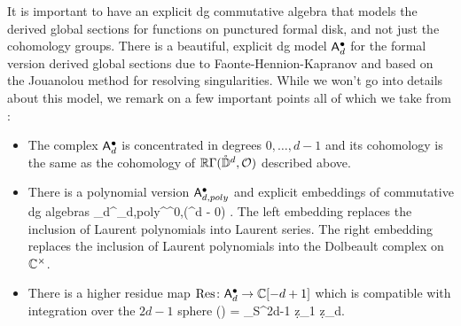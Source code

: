 \documentclass[11pt]{amsart}
\begin{document}
It is important to have an explicit dg commutative algebra that models the derived global sections for functions on punctured formal disk,
and not just the cohomology groups.
There is a beautiful, explicit dg model $\mathsf A^\bullet_d$ for the formal version derived global sections due to Faonte-Hennion-Kapranov \cite{FHK} and based on the Jouanolou method for resolving singularities. 
While we won't go into details about this model, we remark on a few important points all of which we take from \cite{FHK}:
\begin{itemize}
\item The complex $\mathsf A^\bullet_d$ is concentrated in degrees $0,\ldots,d-1$ and its cohomology is the same as the cohomology of $\mathbb R \Gamma(\mathring{\mathbb D}^d, \mathcal O)$ described above.
\item There is a polynomial version $\mathsf A_{d,poly}^\bullet$ and explicit embeddings of commutative dg algebras 
\beqn
\sfA_{d}^\bu \hookleftarrow \sfA_{d,poly}^\bu \hookrightarrow \Omega^{0,\bu}(\CC^d - 0) .
\eeqn
The left embedding replaces the inclusion of Laurent polynomials into Laurent series.
The right embedding replaces the inclusion of Laurent polynomials into the Dolbeault complex on $\mathbb C^\times$.
\item There is a higher residue map $\text{Res} \colon \mathsf A_d^{\bullet} \to \mathbb C[-d+1]$ which is compatible with integration over the $2d-1$ sphere
\beqn
\label{eq:res}
\Res(\alpha) = \oint_{S^{2d-1}} \alpha \wedge \d z_1 \wedge \cdots \wedge \d z_d.
\eeqn
\end{itemize}



\end{document}
